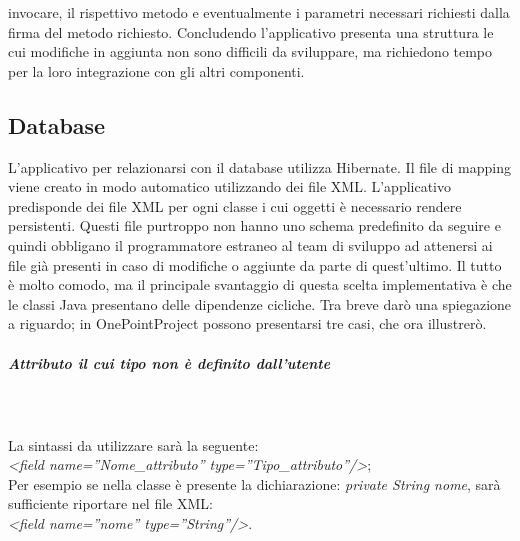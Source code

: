 invocare, il rispettivo metodo e eventualmente i parametri necessari richiesti dalla firma del metodo richiesto. Concludendo l\textquoteright{}applicativo presenta una struttura le cui modifiche in aggiunta non sono difficili da sviluppare, ma richiedono tempo per la loro integrazione con gli altri componenti. 

\subsection{Database}
L\textquoteright{}applicativo per relazionarsi con il database utilizza Hibernate. Il file di mapping viene creato in modo automatico utilizzando dei file XML. L\textquoteright{}applicativo predisponde dei file XML per ogni classe i cui oggetti \`{e} necessario rendere persistenti. Questi file purtroppo non hanno uno schema predefinito da seguire e quindi obbligano il programmatore estraneo al team di sviluppo ad attenersi ai file gi\`{a} presenti in caso di modifiche o aggiunte da parte di quest\textquoteright{}ultimo. Il tutto \`{e} molto comodo, ma il principale svantaggio di questa scelta implementativa \`{e} che le classi Java presentano delle dipendenze cicliche. Tra breve dar\`{o} una spiegazione a riguardo; in OnePointProject possono presentarsi tre casi, che ora illustrer\`{o}.

\subparagraph{Attributo il cui tipo non \`{e} definito dall\textquoteright{}utente} \quad \quad \\ \\
La sintassi da utilizzare sar\`{a} la seguente: \\
\textit{<field name=''Nome\_attributo'' type=''Tipo\_attributo''/>}; \\
Per esempio se nella classe \`{e} presente la dichiarazione: \textit{private String nome}, sar\`{a} sufficiente riportare nel file XML: \\
\textit{<field name=''nome'' type=''String''/>}.


